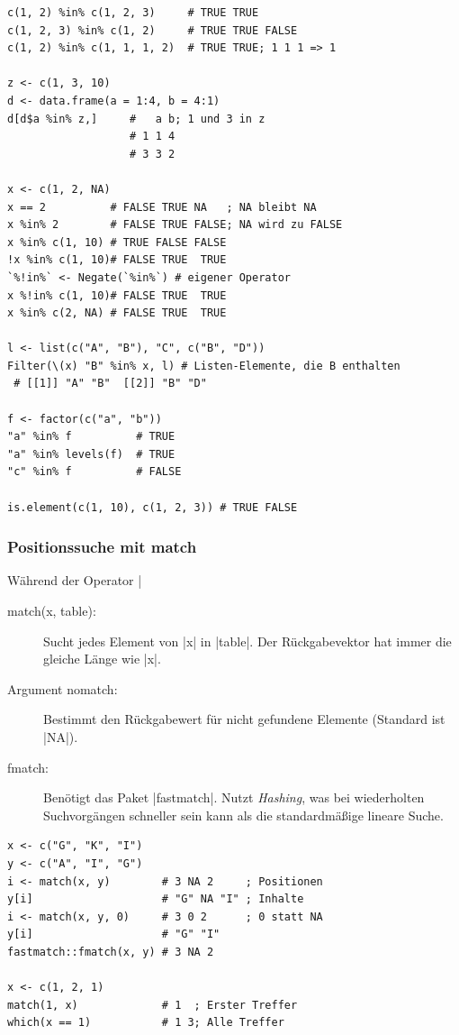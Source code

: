 \documentclass[10pt,twocolumn]{scrartcl}
\renewcommand{\lstinline}{\mycoloredinline}
\begin{document}
\begin{lstlisting}
c(1, 2) %in% c(1, 2, 3)     # TRUE TRUE
c(1, 2, 3) %in% c(1, 2)     # TRUE TRUE FALSE
c(1, 2) %in% c(1, 1, 1, 2)  # TRUE TRUE; 1 1 1 => 1

z <- c(1, 3, 10)
d <- data.frame(a = 1:4, b = 4:1)
d[d$a %in% z,]     #   a b; 1 und 3 in z
                   # 1 1 4
                   # 3 3 2

x <- c(1, 2, NA)
x == 2          # FALSE TRUE NA   ; NA bleibt NA
x %in% 2        # FALSE TRUE FALSE; NA wird zu FALSE
x %in% c(1, 10) # TRUE FALSE FALSE
!x %in% c(1, 10)# FALSE TRUE  TRUE
`%!in%` <- Negate(`%in%`) # eigener Operator
x %!in% c(1, 10)# FALSE TRUE  TRUE
x %in% c(2, NA) # FALSE TRUE  TRUE

l <- list(c("A", "B"), "C", c("B", "D"))
Filter(\(x) "B" %in% x, l) # Listen-Elemente, die B enthalten
 # [[1]] "A" "B"  [[2]] "B" "D"

f <- factor(c("a", "b"))
"a" %in% f          # TRUE
"a" %in% levels(f)  # TRUE
"c" %in% f          # FALSE

is.element(c(1, 10), c(1, 2, 3)) # TRUE FALSE
\end{lstlisting}


\subsubsection{Positionssuche mit match}

Während der Operator \lstinline|%in%| lediglich prüft, \emph{ob} ein Element vorhanden ist (Boolean), geben diese Funktionen die exakte Position (\emph{Index}) des \textbf{ersten} Treffers zurück.

\begin{description}
\item[match(x, table):] Sucht jedes Element von \lstinline|x| in \lstinline|table|. Der Rückgabevektor hat immer die gleiche Länge wie \lstinline|x|.
\item[Argument nomatch:] Bestimmt den Rückgabewert für nicht gefundene Elemente (Standard ist \lstinline|NA|).
\item[fmatch:] Benötigt das Paket \lstinline|fastmatch|. Nutzt \emph{Hashing}, was bei wiederholten Suchvorgängen schneller sein kann als die standardmäßige lineare Suche.
\end{description}

\begin{lstlisting}
x <- c("G", "K", "I")
y <- c("A", "I", "G")
i <- match(x, y)        # 3 NA 2     ; Positionen
y[i]                    # "G" NA "I" ; Inhalte
i <- match(x, y, 0)     # 3 0 2      ; 0 statt NA
y[i]                    # "G" "I"
fastmatch::fmatch(x, y) # 3 NA 2

x <- c(1, 2, 1)
match(1, x)             # 1  ; Erster Treffer
which(x == 1)           # 1 3; Alle Treffer
\end{lstlisting}
\end{document}
